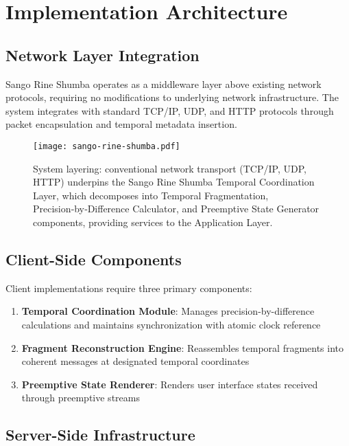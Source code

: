 \documentclass[12pt,a4paper]{article}
\begin{document}
\section{Implementation Architecture}

\subsection{Network Layer Integration}

Sango Rine Shumba operates as a middleware layer above existing network protocols, requiring no modifications to underlying network infrastructure. The system integrates with standard TCP/IP, UDP, and HTTP protocols through packet encapsulation and temporal metadata insertion.

\begin{figure}[H]
\centering
\texttt{[image: sango-rine-shumba.pdf]}
\caption{System layering: conventional network transport (TCP/IP, UDP, HTTP) underpins the Sango Rine Shumba Temporal Coordination Layer, which decomposes into Temporal Fragmentation, Precision‑by‑Difference Calculator, and Preemptive State Generator components, providing services to the Application Layer.}
\label{fig:sango-rine-shumba}
\end{figure}

\subsection{Client-Side Components}

Client implementations require three primary components:

\begin{enumerate}
\item \textbf{Temporal Coordination Module}: Manages precision-by-difference calculations and maintains synchronization with atomic clock reference
\item \textbf{Fragment Reconstruction Engine}: Reassembles temporal fragments into coherent messages at designated temporal coordinates
\item \textbf{Preemptive State Renderer}: Renders user interface states received through preemptive streams
\end{enumerate}

\subsection{Server-Side Infrastructure}
\end{document}

